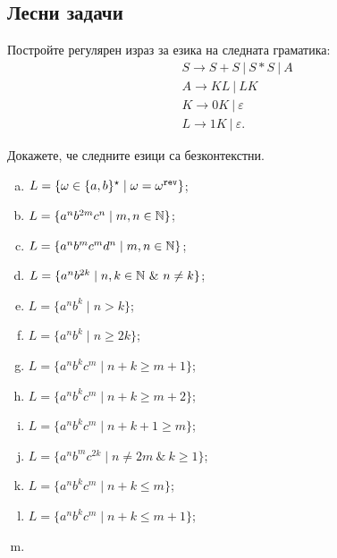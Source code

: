 \subsection{Лесни задачи}

\begin{problem}
  Постройте регулярен израз за езика на следната граматика:
  \begin{align*}
    & S \to S + S\ |\ S * S\ |\ A\\
    & A \to KL\ |\ LK\\
    & K \to 0K\ |\ \varepsilon\\
    & L \to 1K\ |\ \varepsilon.
  \end{align*}
\end{problem}

\begin{problem}
  Докажете, че следните езици са безконтекстни.
  \begin{enumerate}[a)]
  \item
    $L = \{\omega \in \{a,b\}^\star \mid \omega = \omega^{\texttt{rev}}\}$;
  \item
    $L = \{a^nb^{2m}c^{n} \mid m,n \in \mathbb{N}\}$;
  \item
    $L = \{a^nb^{m}c^{m}d^n \mid m,n \in \mathbb{N}\}$;
  \item
    $L = \{a^nb^{2k} \mid n,k \in \Nat\ \&\ n \neq k\}$;
  \item
    $L = \{a^nb^k \mid n > k\}$;
  \item
    $L = \{a^nb^k \mid n \geq 2k\}$;
  \item
    $L = \{a^nb^kc^m \mid n + k \geq m+1\}$;
  \item
    $L = \{a^nb^kc^m \mid n + k \geq m+2\}$;
  \item
    $L = \{a^nb^kc^m \mid n + k + 1 \geq m\}$;
  \item
    $L = \{a^nb^mc^{2k} \mid n \neq 2m\ \&\ k \geq 1\}$;
  \item
    $L = \{a^nb^kc^m \mid n + k \leq m\}$;
  \item
    $L = \{a^nb^kc^m \mid n + k \leq m+1\}$;
  \item

\end{enumerate}
\end{problem}
